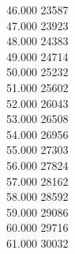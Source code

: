 { 46.000	23587 \\
 47.000	23923 \\
 48.000	24383 \\
 49.000	24714 \\
 50.000	25232 \\
 51.000	25602 \\
 52.000	26043 \\
 53.000	26508 \\
 54.000	26956 \\
 55.000	27303 \\
 56.000	27824 \\
 57.000	28162 \\
 58.000	28592 \\
 59.000	29086 \\
 60.000	29716 \\
 61.000	30032 \\
}

